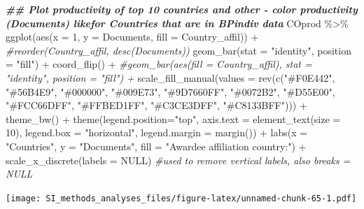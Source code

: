\documentclass[
]{article}
\newenvironment{Shaded}{\begin{snugshade}}{\end{snugshade}}
\newcommand{\AttributeTok}[1]{\textcolor[rgb]{0.77,0.63,0.00}{#1}}
\newcommand{\CommentTok}[1]{\textcolor[rgb]{0.56,0.35,0.01}{\textit{#1}}}
\newcommand{\ConstantTok}[1]{\textcolor[rgb]{0.00,0.00,0.00}{#1}}
\newcommand{\DecValTok}[1]{\textcolor[rgb]{0.00,0.00,0.81}{#1}}
\newcommand{\DocumentationTok}[1]{\textcolor[rgb]{0.56,0.35,0.01}{\textbf{\textit{#1}}}}
\newcommand{\FunctionTok}[1]{\textcolor[rgb]{0.00,0.00,0.00}{#1}}
\newcommand{\NormalTok}[1]{#1}
\newcommand{\SpecialCharTok}[1]{\textcolor[rgb]{0.00,0.00,0.00}{#1}}
\newcommand{\StringTok}[1]{\textcolor[rgb]{0.31,0.60,0.02}{#1}}
\begin{document}
\begin{Shaded}
\begin{Highlighting}[]
\DocumentationTok{\#\# Plot productivity of top 10 countries and other {-} color productivity (Documents) likefor Countries that are in BPindiv data}
\NormalTok{COprod }\SpecialCharTok{\%\textgreater{}\%} 
  \FunctionTok{ggplot}\NormalTok{(}\FunctionTok{aes}\NormalTok{(}\AttributeTok{x =} \DecValTok{1}\NormalTok{, }\AttributeTok{y =}\NormalTok{ Documents, }\AttributeTok{fill =}\NormalTok{ Country\_affil)) }\SpecialCharTok{+} \CommentTok{\#reorder(Country\_affil, desc(Documents))}
  \FunctionTok{geom\_bar}\NormalTok{(}\AttributeTok{stat =} \StringTok{"identity"}\NormalTok{, }\AttributeTok{position =} \StringTok{"fill"}\NormalTok{) }\SpecialCharTok{+}
  \FunctionTok{coord\_flip}\NormalTok{() }\SpecialCharTok{+} 
  \CommentTok{\#geom\_bar(aes(fill = Country\_affil), stat = "identity", position = "fill") +}
  \FunctionTok{scale\_fill\_manual}\NormalTok{(}\AttributeTok{values =} \FunctionTok{rev}\NormalTok{(}\FunctionTok{c}\NormalTok{(}\StringTok{"\#F0E442"}\NormalTok{, }\StringTok{"\#56B4E9"}\NormalTok{, }\StringTok{"\#000000"}\NormalTok{, }\StringTok{"\#009E73"}\NormalTok{, }\StringTok{"\#9D7660FF"}\NormalTok{, }\StringTok{"\#0072B2"}\NormalTok{, }\StringTok{"\#D55E00"}\NormalTok{, }\StringTok{"\#FCC66DFF"}\NormalTok{, }\StringTok{"\#FFBED1FF"}\NormalTok{, }\StringTok{"\#C3CE3DFF"}\NormalTok{, }\StringTok{"\#C8133BFF"}\NormalTok{))) }\SpecialCharTok{+}
  \FunctionTok{theme\_bw}\NormalTok{() }\SpecialCharTok{+} 
  \FunctionTok{theme}\NormalTok{(}\AttributeTok{legend.position=}\StringTok{"top"}\NormalTok{, }\AttributeTok{axis.text =} \FunctionTok{element\_text}\NormalTok{(}\AttributeTok{size =} \DecValTok{10}\NormalTok{), }\AttributeTok{legend.box =} \StringTok{"horizontal"}\NormalTok{, }\AttributeTok{legend.margin =} \FunctionTok{margin}\NormalTok{()) }\SpecialCharTok{+}
  \FunctionTok{labs}\NormalTok{(}\AttributeTok{x =} \StringTok{"Countries"}\NormalTok{, }\AttributeTok{y =} \StringTok{"Documents"}\NormalTok{, }\AttributeTok{fill =} \StringTok{"Awardee affiliation country:"}\NormalTok{) }\SpecialCharTok{+} 
  \FunctionTok{scale\_x\_discrete}\NormalTok{(}\AttributeTok{labels =} \ConstantTok{NULL}\NormalTok{)  }\CommentTok{\#used to remove vertical labels, also breaks = NULL}
\end{Highlighting}
\end{Shaded}

\texttt{[image: SI\_methods\_analyses\_files/figure-latex/unnamed-chunk-65-1.pdf]}
\end{document}
